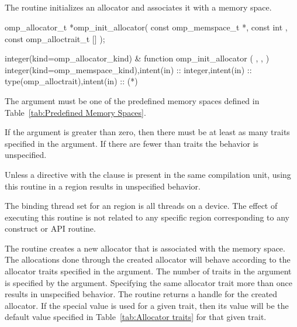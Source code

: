 \subsection{}
\label{subsec:omp_init_allocator}

\summary
The  routine initializes an allocator and associates it with a memory space.

\format
\begin{ccppspecific}
\begin{ompcFunction}
omp_allocator_t *omp_init_allocator(
  const omp_memspace_t *,
  const int ,
  const omp_alloctrait_t []
);
\end{ompcFunction}
\end{ccppspecific}
\begin{fortranspecific}
\begin{ompfFunction}
integer(kind=omp_allocator_kind) &
function omp_init_allocator ( , ,  )
integer(kind=omp_memspace_kind),intent(in) :: 
integer,intent(in) :: 
type(omp_alloctrait),intent(in) :: (*)
\end{ompfFunction}
\end{fortranspecific}

\constraints

The  argument must be one of the predefined memory spaces defined in Table~\ref{tab:Predefined Memory Spaces}.

If the  argument is greater than zero, then there must be at least as many traits
specified in the  argument. If there are fewer than  traits the behavior is
unspecified.

Unless a  directive with the  clause is present in the same compilation unit, using this routine in a  region results in unspecified behavior.

\binding

The binding thread set for an  region is all threads on a device.
The effect of executing this routine is not related to any specific region corresponding to any construct or API routine.

\effect

The  routine creates a new allocator that is associated with the  memory space. 
The allocations done through the created allocator will behave according to the allocator traits specified in the  argument.  The number of traits in the  argument is specified by the  argument. Specifying the same allocator trait more than once results in unspecified behavior. The routine returns a handle for the created allocator. If the special  value is used for a given trait, then its value will be the default value specified in Table~\ref{tab:Allocator traits} for that given trait.


